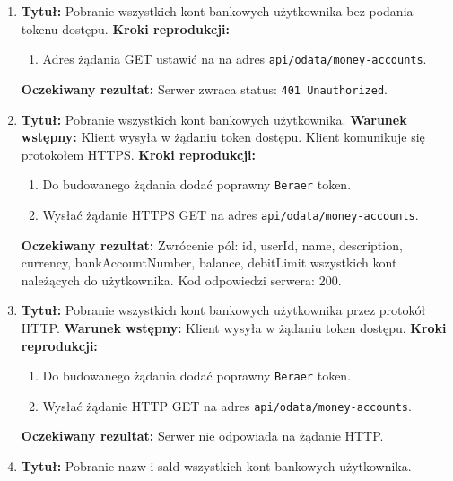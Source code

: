 \begin{enumerate}[labelwidth=1em,label=\Roman*]
\item 
    \textbf{Tytuł:} Pobranie wszystkich kont bankowych użytkownika bez podania tokenu dostępu. \newline
    \textbf{Kroki reprodukcji:}  \begin{enumerate}[label=\arabic*.]
        \item Adres żądania GET ustawić na na adres \texttt{api/odata/money-accounts}.
    \end{enumerate}
    \textbf{Oczekiwany rezultat:}  Serwer zwraca status: \texttt{401 Unauthorized}. \newline
\item 
    \textbf{Tytuł:} Pobranie wszystkich kont bankowych użytkownika. \newline
    \textbf{Warunek wstępny:} Klient wysyła w żądaniu token dostępu. Klient komunikuje się protokołem HTTPS. \newline
    \textbf{Kroki reprodukcji:}  \begin{enumerate}[label=\arabic*.]
        \item Do budowanego żądania dodać poprawny \texttt{Beraer} token.
        \item Wysłać żądanie HTTPS GET na adres \texttt{api/odata/money-accounts}.
    \end{enumerate}
    \textbf{Oczekiwany rezultat:}  Zwrócenie pól: id, userId, name, description, currency, bankAccountNumber, balance, debitLimit wszystkich kont należących do użytkownika. Kod odpowiedzi serwera: 200. \newline
\item 
    \textbf{Tytuł:} Pobranie wszystkich kont bankowych użytkownika przez protokół HTTP.  \newline
    \textbf{Warunek wstępny:} Klient wysyła w żądaniu token dostępu. \newline
    \textbf{Kroki reprodukcji:}  \begin{enumerate}[label=\arabic*.]
        \item Do budowanego żądania dodać poprawny \texttt{Beraer} token. 
        \item Wysłać żądanie HTTP GET na adres \texttt{api/odata/money-accounts}.
    \end{enumerate}
    \textbf{Oczekiwany rezultat:}  Serwer nie odpowiada na żądanie HTTP. \newline
\item 
    \textbf{Tytuł:} Pobranie nazw i sald wszystkich kont bankowych użytkownika. \newline

\end{enumerate}

